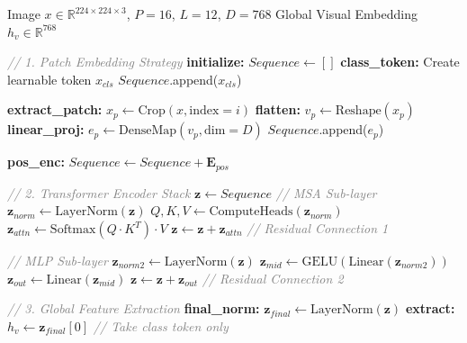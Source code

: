 \documentclass[journal,twoside,web]{ieeecolor}
\begin{document}
\begin{algorithm}[ht!]
\scriptsize
\caption{Proposed training algorithm for the Visual Encoder.}
\label{alg:visual_encoder}
\begin{algorithmic}[1]
\renewcommand{\algorithmicrequire}{\textbf{Input:}}
\renewcommand{\algorithmicensure}{\textbf{Output:}}

\Require Image $x \in \mathbb{R}^{224 \times 224 \times 3}$, $P=16$, $L=12$, $D=768$
\Ensure Global Visual Embedding $h_v \in \mathbb{R}^{768}$

\State \textcolor{gray}{\textit{// 1. Patch Embedding Strategy}}
\State \textbf{initialize:} $Sequence \leftarrow []$
\State \textbf{class\_token:} Create learnable token $x_{cls}$
\State $Sequence$.append($x_{cls}$)

    \State \textbf{extract\_patch:} $x_p \leftarrow \text{Crop}(x, \text{index}=i)$
    \State \textbf{flatten:} $v_p \leftarrow \text{Reshape}(x_p)$
    \State \textbf{linear\_proj:} $e_p \leftarrow \text{DenseMap}(v_p, \text{dim}=D)$
    \State $Sequence$.append($e_p$)
\EndFor

\State \textbf{pos\_enc:} $Sequence \leftarrow Sequence + \mathbf{E}_{pos}$

\State \textcolor{gray}{\textit{// 2. Transformer Encoder Stack}}
\State $\mathbf{z} \leftarrow Sequence$
    \State \textcolor{gray}{\textit{// MSA Sub-layer}}
    \State $\mathbf{z}_{norm} \leftarrow \text{LayerNorm}(\mathbf{z})$
    \State $Q, K, V \leftarrow \text{ComputeHeads}(\mathbf{z}_{norm})$
    \State $\mathbf{z}_{attn} \leftarrow \text{Softmax}(Q \cdot K^T) \cdot V$
    \State $\mathbf{z} \leftarrow \mathbf{z} + \mathbf{z}_{attn}$ \textcolor{gray}{\textit{// Residual Connection 1}}
    
    \State \textcolor{gray}{\textit{// MLP Sub-layer}}
    \State $\mathbf{z}_{norm2} \leftarrow \text{LayerNorm}(\mathbf{z})$
    \State $\mathbf{z}_{mid} \leftarrow \text{GELU}(\text{Linear}(\mathbf{z}_{norm2}))$
    \State $\mathbf{z}_{out} \leftarrow \text{Linear}(\mathbf{z}_{mid})$
    \State $\mathbf{z} \leftarrow \mathbf{z} + \mathbf{z}_{out}$ \textcolor{gray}{\textit{// Residual Connection 2}}
\EndFor

\State \textcolor{gray}{\textit{// 3. Global Feature Extraction}}
\State \textbf{final\_norm:} $\mathbf{z}_{final} \leftarrow \text{LayerNorm}(\mathbf{z})$
\State \textbf{extract:} $h_v \leftarrow \mathbf{z}_{final}[0]$ \textcolor{gray}{\textit{// Take class token only}}

\end{algorithmic}
\end{algorithm}
\end{document}
